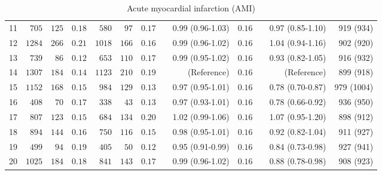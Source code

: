 \documentclass[]{article}\usepackage[]{graphicx}\usepackage[]{color}
\begin{document}
\begin{landscape}
\begin{table}[!tbp]
\begin{center}
\begin{tabular}{lrrrrrrcrrcrr}
11&$ 705$&$125$&$0.18$&$ 580$&$ 97$&$0.17$&&0.99 (0.96-1.03)&$0.16$&&0.97 (0.85-1.10)&919 (934)\tabularnewline
12&$1284$&$266$&$0.21$&$1018$&$166$&$0.16$&&0.99 (0.96-1.02)&$0.16$&&1.04 (0.94-1.16)&902 (920)\tabularnewline
13&$ 739$&$ 86$&$0.12$&$ 653$&$110$&$0.17$&&0.99 (0.95-1.02)&$0.16$&&0.93 (0.82-1.05)&916 (932)\tabularnewline
14&$1307$&$184$&$0.14$&$1123$&$210$&$0.19$&&(Reference)&$0.16$&&(Reference)&899 (918)\tabularnewline
15&$1152$&$168$&$0.15$&$ 984$&$129$&$0.13$&&0.97 (0.95-1.01)&$0.16$&&0.78 (0.70-0.87)&979 (1004)\tabularnewline
16&$ 408$&$ 70$&$0.17$&$ 338$&$ 43$&$0.13$&&0.97 (0.93-1.01)&$0.16$&&0.78 (0.66-0.92)&936 (950)\tabularnewline
17&$ 807$&$123$&$0.15$&$ 684$&$134$&$0.20$&&1.02 (0.99-1.06)&$0.16$&&1.07 (0.95-1.20)&898 (912)\tabularnewline
18&$ 894$&$144$&$0.16$&$ 750$&$116$&$0.15$&&0.98 (0.95-1.01)&$0.16$&&0.92 (0.82-1.04)&911 (927)\tabularnewline
19&$ 499$&$ 94$&$0.19$&$ 405$&$ 50$&$0.12$&&0.95 (0.91-0.99)&$0.16$&&0.84 (0.73-0.98)&927 (941)\tabularnewline
20&$1025$&$184$&$0.18$&$ 841$&$143$&$0.17$&&0.99 (0.96-1.02)&$0.16$&&0.88 (0.78-0.98)&908 (923)\tabularnewline
\hline
\end{tabular}

\caption{Acute myocardial infarction (AMI)\label{pre.format}}\end{center}


\end{table}
\end{landscape}
\end{document}

